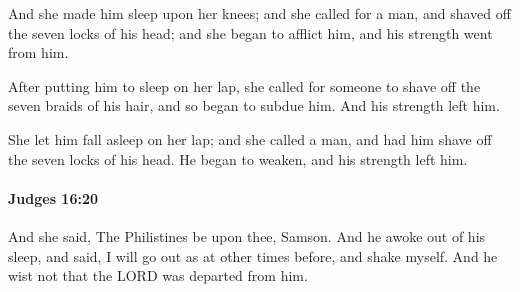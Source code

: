 			\begin{versebox}
					\item[BHS] 
					\item[ASV] And she made him sleep upon her knees; and she called for a man, and shaved off the seven locks of his head; and she began to afflict him, and his strength went from him.
					\item[NIV] After putting him to sleep on her lap, she called for someone to shave off the seven braids of his hair, and so began to subdue him. And his strength left him.
					\item[NRSV] She let him fall asleep on her lap; and she called a man, and had him shave off the seven locks of his head. He began to weaken, and his strength left him.
			\end{versebox}

		\paragraph{Judges 16:20} %
			\label{JUDGES-16-20}

			And she said, The Philistines be upon thee, Samson. And he awoke out of his sleep, and said, I will go out as at other times before, and shake myself. And he wist not that the LORD was departed from him.

